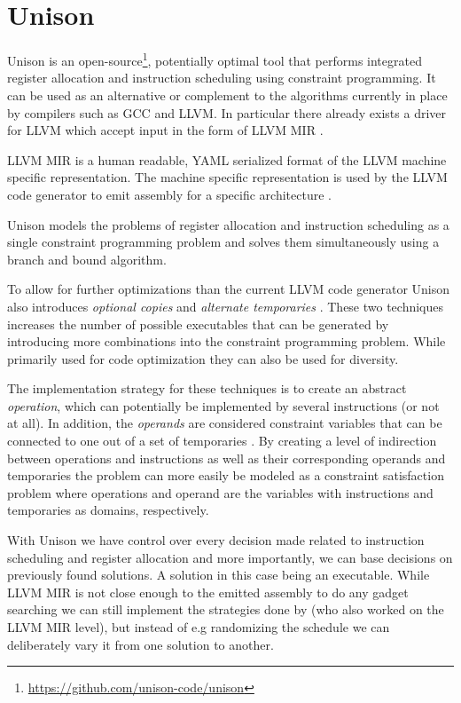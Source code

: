 \section{Unison}
\label{sec:unison}

Unison is an open-source\footnote{\url{https://github.com/unison-code/unison}},
potentially optimal tool that performs integrated register allocation and instruction
scheduling using constraint programming. It can be used as an alternative or complement to
the algorithms currently in place by compilers such as GCC and LLVM. In particular there
already exists a driver for LLVM which accept input in the form of LLVM MIR \cite{unison-docs}.

LLVM MIR is a human readable, YAML serialized format of the LLVM machine specific
representation\cite{llvm-mir-lang-ref}. The machine specific representation is used by the
LLVM code generator to emit assembly for a specific architecture \cite{welcome-to-backend}.

Unison models the problems of register allocation and instruction scheduling as a single
constraint programming problem and solves them simultaneously using a branch and bound
algorithm\cite{unison-docs,reg-alloc-inst-sched-uni,unison-src}.

To allow for further optimizations than the current LLVM code generator Unison also
introduces \textit{optional copies} and \textit{alternate temporaries}
\cite{reg-alloc-inst-sched-uni}. These two techniques increases the number of possible executables
that can be generated by introducing more combinations into the constraint programming
problem. While primarily used for code optimization they can also be used for diversity.

The implementation strategy for these techniques is to create an abstract \textit{operation},
which can potentially be implemented by several instructions (or not at all). In addition,
the \textit{operands} are considered constraint variables that can be connected to one out
of a set of temporaries \cite{unison-docs}. By creating a level of indirection between
operations and instructions as well as their corresponding operands and temporaries the
problem can more easily be modeled as a constraint satisfaction problem where operations
and operand are the variables with instructions and temporaries as domains, respectively.

With Unison we have control over every decision made related to instruction scheduling and
register allocation and more importantly, we can base decisions on previously found solutions.
A solution in this case being an executable. While LLVM MIR is not close enough to the
emitted assembly to do any gadget searching we can still implement the strategies done by
\textcite{large-scale-automated} (who also worked on the LLVM MIR level), but instead of
e.g randomizing the schedule we can deliberately vary it from one solution to another.
